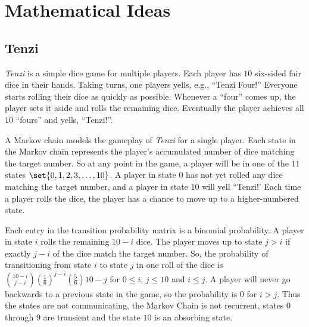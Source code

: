 \documentclass[12pt]{article}
\begin{document}
\hr

\section*{Mathematical Ideas}

\subsection*{Tenzi}

\emph{Tenzi} is a simple dice game for multiple players.  Each player
has \( 10 \) six-sided fair dice in their hands.  Taking turns, one
players yells, e.g., ``Tenzi Four!'' Everyone starts rolling their dice
as quickly as possible.  Whenever a ``four'' comes up, the player sets
it aside and rolls the remaining dice.  Eventually the player achieves
all \( 10 \) ``fours'' and yells, ``Tenzi!''.~%

A Markov chain models the gameplay of \emph{Tenzi} for a single player.
Each state in the Markov chain represents the player’s accumulated
number of dice matching the target number.  So at any point in the game,
a player will be in one of the \( 11 \) states \( \set{0,1,2,3, \ldots,
10} \).  A player in state \( 0 \) has not yet rolled any dice matching
the target number, and a player in state \( 10 \) will yell ``Tenzi!'
Each time a player rolls the dice, the player has a chance to move up to
a higher-numbered state.

Each entry in the transition probability matrix is a binomial
probability.  A player in state \( i \) rolls the remaining \( 10 - i \)
dice.  The player moves up to state \( j > i \) if exactly \( j - i \)
of the dice match the target number.  So, the probability of
transitioning from state \( i \) to state \( j \) in one roll of the
dice is \( \binom{10 - i}{j - i}\left( \frac{1}{6} \right)^{j - i} \left
( \frac{5}{6} \right){10 - j} \) for \( 0 \le i \), \( j \le 10 \) and \(
i \le j \).  A player will never go backwards to a previous state in the
game, so the probability is \( 0 \) for \( i>j \). Thus the states are
not communicating, the Markov Chain is not recurrent, states \( 0 \)
through \( 9 \) are transient and the state \( 10 \) is an absorbing
state.~%
\end{document}
